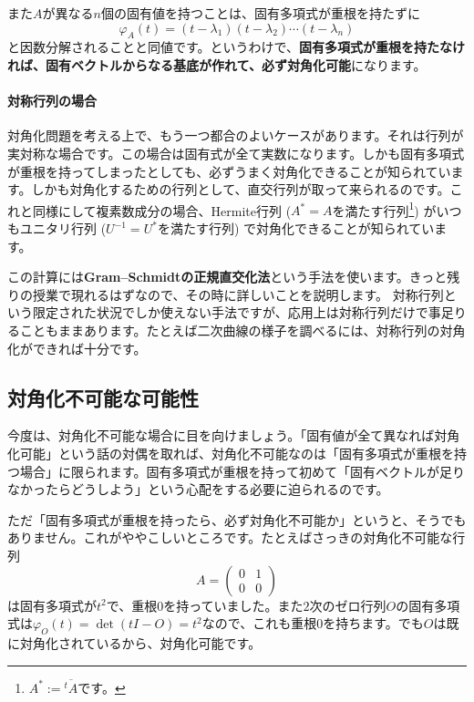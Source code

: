 また$A$が異なる$n$個の固有値を持つことは、固有多項式が重根を持たずに
\[
\varphi_A(t) = (t - \lambda_1)(t - \lambda_2) \cdots (t - \lambda_n)
\]
と因数分解されることと同値です。というわけで、\textbf{固有多項式が重根を持たなければ、固有ベクトルからなる基底が作れて、必ず対角化可能}になります。

\paragraph{対称行列の場合}

対角化問題を考える上で、もう一つ都合のよいケースがあります。それは行列が実対称な場合です。この場合は固有式が全て実数になります。しかも固有多項式が重根を持ってしまったとしても、必ずうまく対角化できることが知られています。しかも対角化するための行列として、直交行列が取って来られるのです。これと同様にして複素数成分の場合、Hermite行列 ($A^* = A$を満たす行列\footnote{$A^* := \overline{{}^t\!A}$です。}) がいつもユニタリ行列 ($U^{-1} = U^*$を満たす行列) で対角化できることが知られています。

この計算には\textbf{Gram--Schmidtの正規直交化法}という手法を使います。きっと残りの授業で現れるはずなので、その時に詳しいことを説明します。	対称行列という限定された状況でしか使えない手法ですが、応用上は対称行列だけで事足りることもままあります。たとえば二次曲線の様子を調べるには、対称行列の対角化ができれば十分です。

\subsection{対角化不可能な可能性}

今度は、対角化不可能な場合に目を向けましょう。「固有値が全て異なれば対角化可能」という話の対偶を取れば、対角化不可能なのは「固有多項式が重根を持つ場合」に限られます。固有多項式が重根を持って初めて「固有ベクトルが足りなかったらどうしよう」という心配をする必要に迫られるのです。

ただ「固有多項式が重根を持ったら、必ず対角化不可能か」というと、そうでもありません。これがややこしいところです。たとえばさっきの対角化不可能な行列
\[
A =
\begin{pmatrix}
0 & 1 \\
0 & 0
\end{pmatrix}
\]
は固有多項式が$t^2$で、重根$0$を持っていました。また$2$次のゼロ行列$O$の固有多項式は$\varphi_O(t) = \det(tI - O) = t^2$なので、これも重根$0$を持ちます。でも$O$は既に対角化されているから、対角化可能です。

